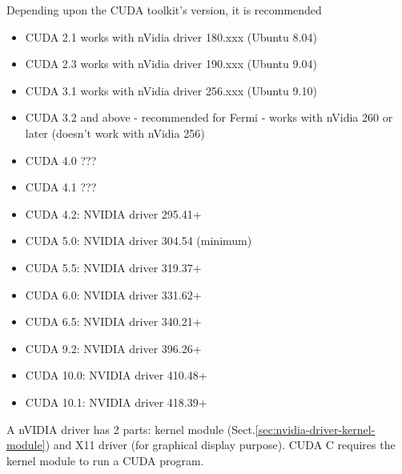 Depending upon the CUDA toolkit's version, it is recommended
\begin{itemize}
\item CUDA 2.1 works with nVidia driver 180.xxx (Ubuntu 8.04)
\item CUDA 2.3 works with nVidia driver 190.xxx (Ubuntu 9.04)
\item CUDA 3.1 works with nVidia driver 256.xxx (Ubuntu 9.10)
\item CUDA 3.2 and above - recommended for Fermi - works with nVidia 260 or
later (doesn't work with nVidia 256)
\item CUDA 4.0 ???
\item CUDA 4.1 ???
\item CUDA 4.2: NVIDIA driver 295.41+
\item CUDA 5.0: NVIDIA driver 304.54 (minimum)
\item CUDA 5.5: NVIDIA driver 319.37+
\item CUDA 6.0: NVIDIA driver 331.62+
\item CUDA 6.5: NVIDIA driver 340.21+

\item CUDA 9.2:  NVIDIA driver 396.26+

\item CUDA 10.0:  NVIDIA driver 410.48+

\item CUDA 10.1:  NVIDIA driver 418.39+
\end{itemize}


A nVIDIA driver has 2 parts: kernel module
(Sect.\ref{sec:nvidia-driver-kernel-module}) and X11 driver (for graphical
display purpose). CUDA C requires the kernel module to run a CUDA program.

